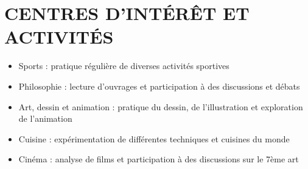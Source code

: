 \documentclass{article}
\begin{document}
\section{CENTRES D'INTÉRÊT ET ACTIVITÉS}
\begin{itemize}
\item Sports : pratique régulière de diverses activités sportives
\item Philosophie : lecture d'ouvrages et participation à des discussions et débats
\item Art, dessin et animation : pratique du dessin, de l'illustration et exploration de l'animation
\item Cuisine : expérimentation de différentes techniques et cuisines du monde
\item Cinéma : analyse de films et participation à des discussions sur le 7ème art
\end{itemize}
        
\end{document}
